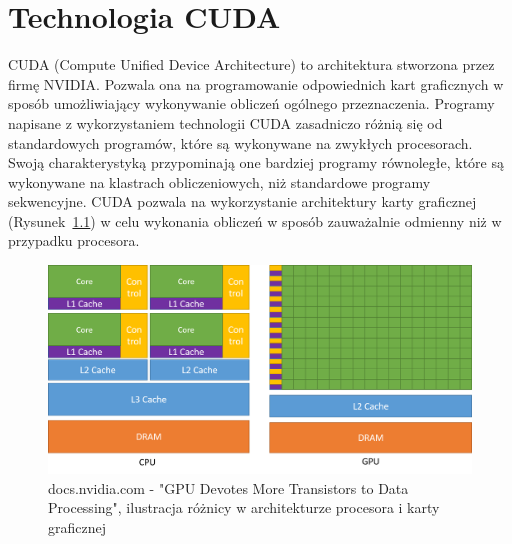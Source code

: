 \chapter{Technologia CUDA}

CUDA\cite{bib:CUDA} (Compute Unified Device Architecture) to architektura stworzona przez firmę NVIDIA. Pozwala ona na programowanie odpowiednich kart graficznych w sposób umożliwiający wykonywanie obliczeń ogólnego przeznaczenia. Programy napisane z wykorzystaniem technologii CUDA zasadniczo różnią się od standardowych programów, które są wykonywane na zwykłych procesorach. Swoją charakterystyką przypominają one bardziej programy równoległe, które są wykonywane na klastrach obliczeniowych, niż standardowe programy sekwencyjne. CUDA pozwala na wykorzystanie architektury karty graficznej (Rysunek~\ref{fig:GPU Devotes More Transistors to Data Processing}) w celu wykonania obliczeń w sposób zauważalnie odmienny niż w przypadku procesora.
\begin{figure}[H]
    \centering
    \includegraphics[scale=0.5]{./fig/gpu-devotes-more-transistors-to-data-processing.png}
    \caption{docs.nvidia.com - "GPU Devotes More Transistors to Data Processing", ilustracja różnicy w architekturze procesora i karty graficznej}
    \label{fig:GPU Devotes More Transistors to Data Processing}
\end{figure}

